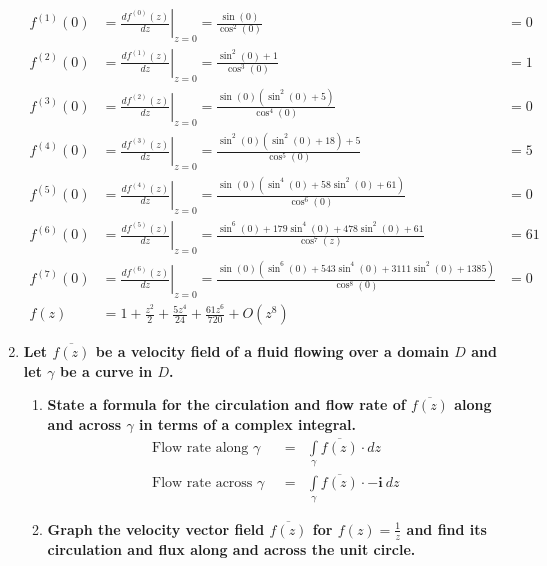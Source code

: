 \documentclass{article}%
\newcommand\I{\textbf{i}}
\begin{document}
\begin{enumerate}
\begin{align*}
        f^{(1)}(0) &= \left. \frac{df^{(0)}(z)}{dz}\right|_{z=0} = \frac{\sin(0)}{\cos^2(0)}                                            &= 0 \\
        f^{(2)}(0) &= \left. \frac{df^{(1)}(z)}{dz}\right|_{z=0} = \frac{\sin^2(0)+1}{\cos^3(0)}                                        &= 1 \\
        f^{(3)}(0) &= \left. \frac{df^{(2)}(z)}{dz}\right|_{z=0} = \frac{\sin(0)(\sin^2(0)+5)}{\cos^4(0)}                               &= 0 \\
        f^{(4)}(0) &= \left. \frac{df^{(3)}(z)}{dz}\right|_{z=0} = \frac{\sin^2(0)(\sin^2(0)+18)+5}{\cos^5(0)}                          &= 5 \\ 
        f^{(5)}(0) &= \left. \frac{df^{(4)}(z)}{dz}\right|_{z=0} = \frac{\sin(0)(\sin^4(0)+58\sin^2(0)+61)}{\cos^6(0)}                  &= 0 \\
        f^{(6)}(0) &= \left. \frac{df^{(5)}(z)}{dz}\right|_{z=0} = \frac{\sin^6(0)+179\sin^4(0)+478\sin^2(0)+61}{\cos^7(z)}             &= 61 \\
        f^{(7)}(0) &= \left. \frac{df^{(6)}(z)}{dz}\right|_{z=0} = \frac{\sin(0)(\sin^6(0)+543\sin^4(0)+3111\sin^2(0)+1385)}{\cos^8(0)} &= 0 \\
        f(z)       &= 1 + \frac{z^2}{2} + \frac{5 z^4}{24} + \frac{61 z^6}{720} + O(z^8) 
    \end{align*}
    \item %
    \textbf{Let $\overline{f(z)}$ be a velocity field of a fluid flowing over a domain $D$ and let $\gamma$ be a curve in $D$.}
    \begin{enumerate}[label=\alph*)]
        \item %
        \textbf{State a formula for the circulation and flow rate of $\overline{f(z)}$ along and across $\gamma$ in terms of a complex integral.}
        \begin{eqnarray*}
            \text{Flow rate along $\gamma$ } &=& \int\limits_{\gamma}{\overline{f(z)}\cdot dz}\\
            \text{Flow rate across $\gamma$ } &=& \int\limits_{\gamma}{\overline{f(z)}\cdot -\I~dz}
        \end{eqnarray*}
        \item %
        \textbf{Graph the velocity vector field $\overline{f(z)}$ for $f(z)=\frac{1}{z}$ and find its circulation and flux along and across the unit circle.}
        \begin{center}

\end{center}
\end{enumerate}
\end{enumerate}
\end{document}

